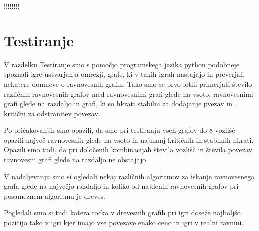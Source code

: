 \documentclass[fin1, tisk]{fmfdelo}
\begin{document}
\begin{dokaz}
!!!!!!!!
\end{dokaz}


\section{Testiranje}

V razdelku Testiranje smo s pomočjo programskega jezika python podobneje spoznali igre ustvarjanja omrežji,
grafe, ki v takih igrah nastajajo in preverjali nekatere domneve o ravnovesnih grafih.
Tako smo se prvo lotili primerjati število različnih ravnovesnih grafov med ravnovesnimi grafi glede na vsoto,
ravnovesnimi grafi glede na razdaljo in grafi, ki so hkrati stabilni za dodajanje pvezav in kritični za odstranitev povezav.

Po pričakovanjih smo opazili, da smo pri testiranju vseh grafov do $8$ vozlišč opazili največ ravnovesnih glede na vsoto
in najmanj kritičnih in stabilnih hkrati. Opazili smo tudi, da pri določenih kombinacijah števila vozlišč in števila povezav
ravnovesni grafi glede na razdaljo ne obstajajo.


V nadaljevanju smo si ogledali nekaj različnih algoritmov za iskanje ravnovesnega grafa glede na največjo razdaljo in
koliko od najdenih ravnovesnih grafov pri posameznem algoritmu je dreves.


Pogledali smo si tudi katera točka v drevesnih grafih pri igri doseže najboljšo pozicijo tako v igri
kjer imajo vse povezave enako ceno in igri v realni ravnini.
\end{document}
